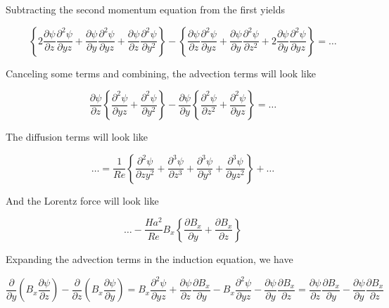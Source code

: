\documentclass[11pt]{article}
\begin{document}
Subtracting the second momentum equation from the first yields

\begin{equation}
	\left\{
	2
	\frac{\partial \psi }{\partial z}
	\frac{\partial^2 \psi}{\partial yz}
	+
	\frac{\partial \psi}{\partial y}
	\frac{\partial^2 \psi}{\partial yz} +
	\frac{\partial \psi}{\partial z}
	\frac{\partial^2 \psi}{\partial y^2}
	\right\}
	-
	\left\{
	\frac{\partial \psi}{\partial z}
	\frac{\partial^2 \psi}{\partial yz} +
	\frac{\partial \psi}{\partial y}
	\frac{\partial^2 \psi}{\partial z^2}
	+
	2
	\frac{\partial \psi }{\partial y}
	\frac{\partial^2 \psi}{\partial yz}
	\right\}
	=
	\dots
\end{equation}

Canceling some terms and combining, the advection terms will look like


\begin{equation}
	\frac{\partial \psi }{\partial z}
	\left\{
	\frac{\partial^2 \psi}{\partial yz}
	+
	\frac{\partial^2 \psi}{\partial y^2}
	\right\}
	-
	\frac{\partial \psi}{\partial y}
	\left\{
	\frac{\partial^2 \psi}{\partial z^2}
	+
	\frac{\partial^2 \psi}{\partial yz}
	\right\}
	=
	\dots
\end{equation}


The diffusion terms will look like

\begin{equation}
	\dots
	=
	\frac{1}{Re}
	\left\{
	\frac{\partial^2 \psi}{\partial z y^2}
	+
	\frac{\partial^3 \psi}{\partial z^3}
	+
	\frac{\partial^3 \psi}{\partial y^3}
	+\frac{\partial^3 \psi}{\partial y z^2}
	\right\}
	+ \dots
\end{equation}

And the Lorentz force will look like

\begin{equation}
	\dots
	- 
	\frac{Ha^2}{Re}
	B_x
	\left\{
	\frac{\partial B_x}{\partial y} 
	+
	\frac{\partial B_x}{\partial z}
	\right\}
\end{equation}

Expanding the advection terms in the induction equation, we have

\begin{equation}
	\frac{\partial}{\partial y} \left( B_x \frac{\partial \psi}{\partial z} \right)
	- \frac{\partial}{\partial z} \left( B_x \frac{\partial \psi}{\partial y} \right)
	=
	B_x \frac{\partial^2 \psi}{\partial yz}
	+
	\frac{\partial \psi}{\partial z}
	\frac{\partial B_x}{\partial y}
	-
	B_x
	\frac{\partial^2 \psi}{\partial y z}
	-
	\frac{\partial \psi}{\partial y}
	\frac{\partial B_x}{\partial z}
	=
	\frac{\partial \psi}{\partial z}
	\frac{\partial B_x}{\partial y}
	-
	\frac{\partial \psi}{\partial y}
	\frac{\partial B_x}{\partial z}
\end{equation}
\end{document}
